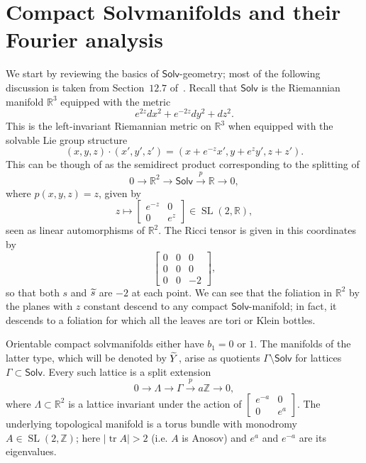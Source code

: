 \documentclass[11pt]{article}
\theoremstyle{definition}
\numberwithin{equation}{section}
\numberwithin{figure}{section}
\numberwithin{table}{section}
\newcommand{\Solv}{\mathsf{Solv}}
\DeclareMathOperator{\SL}{SL}
\DeclareMathOperator{\tr}{tr}
\let\oldtilde\tilde
\renewcommand*{\tilde}[1]{\mathchoice{\widetilde{#1}}{\widetilde{#1}}{\oldtilde{#1}}{\oldtilde{#1}}}\let\oldhat\hat
\renewcommand*{\hat}[1]{\mathchoice{\widehat{#1}}{\widehat{#1}}{\oldhat{#1}}{\oldhat{#1}}}
\begin{document}
\section{Compact Solvmanifolds and their Fourier analysis}\label{fourier}

We start by reviewing the basics of $\Solv$-geometry; most of the following discussion is taken from Section~$12.7$ of~\cite{Mar}. Recall that $\Solv$ is the Riemannian manifold $\mathbb{R}^3$ equipped with the metric
\[
e^{2z}dx^2+e^{-2z}dy^2+dz^2.
\]
This is the left-invariant Riemannian metric on $\mathbb{R}^3$ when equipped with the solvable Lie group structure
\[
(x,y,z)\cdot(x',y',z')=(x+e^{-z}x', y+e^{z}y', z+z').
\]
This can be though of as the semidirect product corresponding to the splitting of
\[
0\rightarrow \mathbb{R}^2\rightarrow \Solv\stackrel{p}{\longrightarrow} \mathbb{R}\rightarrow 0,
\]
where $p(x,y,z)=z$, given by
\[
z\mapsto
\begin{bmatrix}e^{-z}&0\\0 &e^{z}
\end{bmatrix}\in\SL(2,\mathbb{R}),
\]
seen as linear automorphisms of $\mathbb{R}^2$. The Ricci tensor is given in this coordinates by
\[
\begin{bmatrix}0&0&0\\0 &0&0\\ 0&0&-2
\end{bmatrix},
\]
so that both $s$ and $\tilde{s}$ are $-2$ at each point. We can see that the foliation in $\mathbb{R}^2$ by the planes with $z$ constant descend to any compact $\Solv$-manifold; in fact, it descends to a foliation for which all the leaves are tori or Klein bottles.


Orientable compact solvmanifolds either have $b_1=0$ or $1$. The manifolds of the latter type, which will be denoted by $\tilde{Y}$, arise as quotients $\Gamma\setminus\Solv$ for lattices $\Gamma\subset \Solv$. Every such lattice is a split extension
\[
0\rightarrow \Lambda\rightarrow \Gamma\stackrel{p}{\longrightarrow} a\mathbb{Z}\rightarrow 0,
\]
where $\Lambda\subset \mathbb{R}^2$ is a lattice invariant under the action of $
\begin{bmatrix}e^{-a}&0\\0 &e^{a}
\end{bmatrix}$. The underlying topological manifold is a torus bundle with monodromy $A\in \SL(2,\mathbb{Z})$; here $|\tr A|>2$ (i.e. $A$ is Anosov) and $e^a$ and $e^{-a}$ are its eigenvalues.
\end{document}
